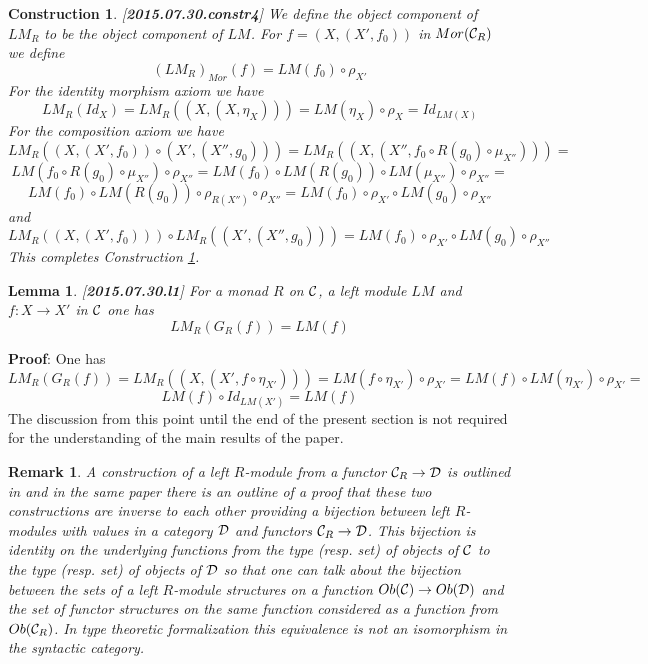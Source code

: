 \documentclass[11pt]{article}
\newenvironment{proof}{{\bf Proof}:}{\vskip 5mm }
\newtheorem{lemma}[proposition]{Lemma}
\newtheorem{remark}[proposition]{Remark}
\newtheorem{construction}[proposition]{Construction}
\newcommand{\llabel}[1]{\label{#1}[{\bf #1}]}
\newcommand{\sr}{\rightarrow}
\begin{document}
\begin{construction}\rm
\llabel{2015.07.30.constr4}
We define the object component of $LM_R$ to be the object component of $LM$. For $f=(X,(X',f_0))$ in $Mor({\cal C}_R)$ we define 
%
$$(LM_R)_{Mor}(f)=LM(f_0)\circ \rho_{X'}$$
%
For the identity morphism axiom we have
%
$$LM_R(Id_X)=LM_R((X,(X,\eta_X)))=LM(\eta_X)\circ \rho_X=Id_{LM(X)}$$
%
For the composition axiom we have
%
$$LM_R((X,(X',f_0))\circ (X',(X'',g_0)))=LM_R((X,(X'',f_0\circ R(g_0)\circ \mu_{X''})))=$$$$LM(f_0\circ R(g_0)\circ \mu_{X''})\circ \rho_{X''}=LM(f_0)\circ LM(R(g_0))\circ LM(\mu_{X''})\circ \rho_{X''}=$$$$LM(f_0)\circ LM(R(g_0))\circ \rho_{R(X'')}\circ \rho_{X''}=LM(f_0)\circ \rho_{X'}\circ LM(g_0)\circ \rho_{X''}$$
%
and
%
$$LM_R((X,(X',f_0)))\circ LM_R((X',(X'',g_0)))=LM(f_0)\circ \rho_{X'}\circ LM(g_0)\circ \rho_{X''}$$
%
This completes Construction \ref{2015.07.30.constr4}.
\end{construction}
%
\begin{lemma}
\llabel{2015.07.30.l1}
For a monad $R$ on $\cal C$, a left module $LM$ and $f:X\sr X'$ in $\cal C$ one has
%
$$LM_R(G_R(f))=LM(f)$$
%
\end{lemma}
%
\begin{proof}
One has
%
$$LM_R(G_R(f))=LM_R((X,(X',f\circ \eta_{X'})))=LM(f\circ \eta_{X'})\circ \rho_{X'}=LM(f)\circ LM(\eta_{X'})\circ \rho_{X'}=$$$$LM(f)\circ Id_{LM(X')}=LM(f)$$
%
\end{proof}
%
The discussion from this point until the end of the present section is not required for the understanding of the main results of the paper.
%
\begin{remark}\rm
A construction of a left $R$-module from a functor ${\cal C}_R\sr {\cal D}$ is outlined in \cite[Prop. 3]{HM2010} and in the same paper there is an outline of a proof that these two constructions are inverse to each other providing a bijection between left $R$-modules with values in a category $\cal D$ and functors ${\cal C}_R\sr {\cal D}$. This bijection is identity on the underlying functions from the type (resp. set) of objects of ${\cal C}$ to the type (resp. set) of objects of $\cal D$ so that one can talk about the bijection between the sets of a left $R$-module structures on a function $Ob({\cal C})\sr Ob({\cal D})$ and the set of functor structures on the same function considered as a function from $Ob({\cal C}_R)$. In type theoretic formalization this equivalence is not an isomorphism in the syntactic category.
\end{remark}
%
\end{document}
